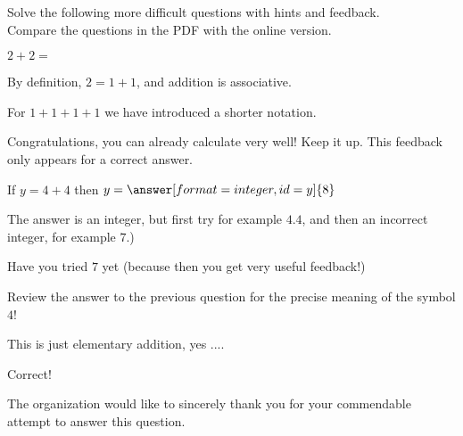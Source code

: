 \documentclass{ximera}
\begin{document}
\begin{exercise}
    Solve the following more difficult questions with hints and feedback. \\
    Compare the questions in the PDF with the online version.

        \begin{question} %
          $2+2 = $
          \begin{hint}
              By definition, $2 = 1+1$, and addition is associative.
           \end{hint}  
           \begin{hint}
              For $1+1+1+1$ we have introduced a shorter notation.
           \end{hint}
           \begin{feedback}[correct] 
              Congratulations, you can already calculate very well! Keep it up. 
              This feedback only appears for a correct answer.
           \end{feedback}          
        \end{question}

        \begin{question}
          If $y=4+4$ then $y = \answer[format=integer,id=y]{8}$ 

          The answer is an integer, but first try for example $4.4$, and then an incorrect integer, for example $7$.)
          \begin{hint}[0]
              Have you tried $7$ yet (because then you get very useful feedback!)
          \end{hint}
          \begin{hint}
            Review the answer to the previous question for the precise meaning of the symbol $4$!
          \end{hint}
          \begin{hint}[3]
            This is just elementary addition, yes ....
          \end{hint}

          \begin{feedback}[correct]
              Correct!
          \end{feedback}
          \begin{feedback}[attempt]
            The organization would like to sincerely thank you for your commendable attempt to answer this question.


\end{feedback}
\end{question}
\end{exercise}
\end{document}
